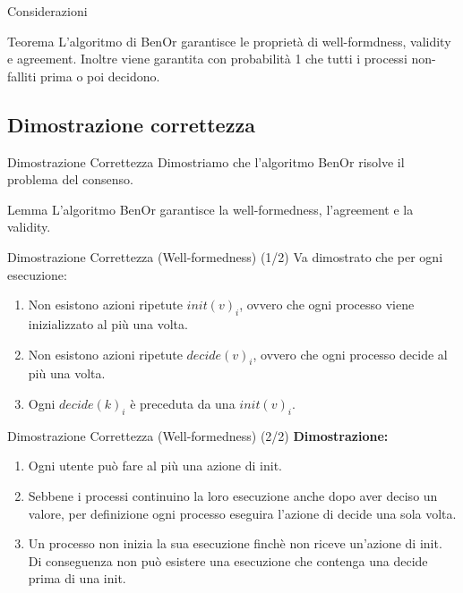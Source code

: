 \documentclass{beamer}
\begin{document}


\begin{frame}{Considerazioni}
    \begin{block}{Teorema}
        L'algoritmo di BenOr garantisce le proprietà di well-formdness, validity e agreement. Inoltre viene garantita con probabilità 1 che tutti i processi non-falliti prima o poi decidono.
    \end{block}
\end{frame}

\subsection{Dimostrazione correttezza}
\begin{frame}{Dimostrazione Correttezza}
    Dimostriamo che l'algoritmo BenOr risolve il problema del consenso.
    
    \begin{block}{Lemma}
        L'algoritmo BenOr garantisce la well-formedness, l'agreement e la validity.
    \end{block}
\end{frame}

\begin{frame}{Dimostrazione Correttezza (Well-formedness) (1/2)} %
    Va dimostrato che per ogni esecuzione:
    \begin{enumerate}
        \item Non esistono azioni ripetute $init(v)_{i}$, ovvero che ogni processo viene inizializzato al più una volta.
        \item Non esistono azioni ripetute $decide(v)_{i}$, ovvero che ogni processo decide al più una volta.
        \item Ogni $decide(k)_{i}$ è preceduta da una $init(v)_{i}$.
    \end{enumerate}
\end{frame}

\begin{frame}{Dimostrazione Correttezza (Well-formedness) (2/2)} %
    \textbf{Dimostrazione:}
    \begin{enumerate}
        \item Ogni utente può fare al più una azione di init.
        \item Sebbene i processi continuino la loro esecuzione anche dopo aver deciso un valore, per definizione ogni processo eseguira l'azione di decide una sola volta.
        \item Un processo non inizia la sua esecuzione finchè non riceve un'azione di init. Di conseguenza non può esistere una esecuzione che contenga una decide prima di una init.
    \end{enumerate}
\end{frame}
\end{document}
